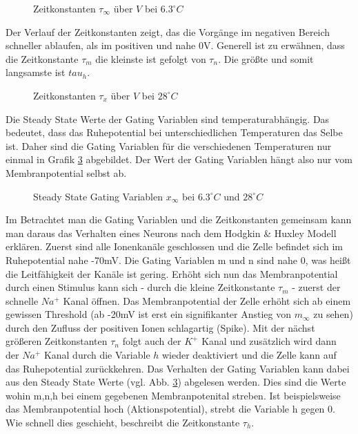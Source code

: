 \documentclass[conference]{IEEEtran}
\begin{document}
\begin{figure}[h!]
  	\centering
    \scalebox{.6}{}
    \caption{Zeitkonstanten $\tau_\infty$ über $V$ bei $6.3^\circ C$}
    \label{fig:Zeitkonstanten6}
\end{figure}

Der Verlauf der Zeitkonstanten zeigt, das die Vorgänge im negativen Bereich schneller ablaufen, als im positiven und nahe 0V. Generell ist zu erwähnen, dass die Zeitkonstante $\tau_m$ die kleinste ist gefolgt von $\tau_n$. Die größte und somit langsamste ist $tau_h$.
\begin{figure}[h!]
  	\centering
    \scalebox{.6}{}
    \caption{Zeitkonstanten $\tau_x$ über $V$ bei $28^\circ C$}
    \label{fig:Zeitkonstanten28}
\end{figure}


Die Steady State Werte der Gating Variablen sind temperaturabhängig. Das bedeutet, dass das Ruhepotential bei unterschiedlichen Temperaturen das Selbe ist. Daher sind die Gating Variablen für die verschiedenen Temperaturen nur einmal in Grafik \ref{fig:Gating1} abgebildet. Der Wert der Gating Variablen hängt also nur vom Membranpotential selbst ab.
\begin{figure}[h!]
  	\centering
    \scalebox{.6}{}
    \caption{Steady State Gating Variablen $x_\infty$ bei $6.3^\circ C$ und $28^\circ C$}
    \label{fig:Gating1}
\end{figure}
Im Betrachtet man die Gating Variablen und die Zeitkonstanten gemeinsam kann man daraus das Verhalten eines Neurons nach dem Hodgkin \& Huxley Modell erklären. Zuerst sind alle Ionenkanäle geschlossen und die Zelle befindet sich im Ruhepotential nahe -70mV. Die Gating Variablen m und n sind nahe 0, was heißt die Leitfähigkeit der Kanäle ist gering. Erhöht sich nun das Membranpotential durch einen Stimulus kann sich - durch die kleine Zeitkonstante $\tau_m$ - zuerst der schnelle $Na^+$ Kanal öffnen. Das Membranpotential der Zelle erhöht sich ab einem gewissen Threshold (ab -20mV ist erst ein signifikanter Anstieg von $m_\infty$ zu sehen) durch den Zufluss der positiven Ionen schlagartig (Spike). Mit der nächst größeren Zeitkonstanten $\tau_n$ folgt auch der $K^+$ Kanal und zusätzlich wird dann der $Na^+$ Kanal durch die Variable $h$ wieder deaktiviert und die Zelle kann auf das Ruhepotential zurückkehren. Das Verhalten der Gating Variablen kann dabei aus den Steady State Werte (vgl. Abb. \ref{fig:Gating1}) abgelesen werden. Dies sind die Werte wohin m,n,h bei einem gegebenen Membranpotenital streben. Ist beispielsweise das Membranpotential hoch (Aktionspotential), strebt die Variable h gegen 0. Wie schnell dies geschieht, beschreibt die Zeitkonstante $\tau_h$.
\end{document}
